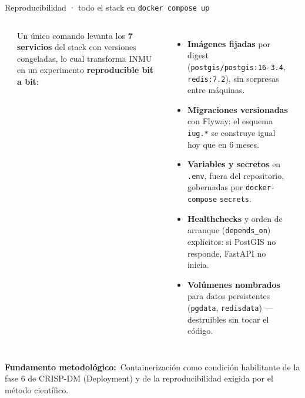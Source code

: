 \documentclass[aspectratio=169,11pt]{beamer}
\newcommand{\hi}[1]{\textcolor{inmuGreen}{\textbf{#1}}}
\newcommand{\framenote}[1]{%
  \vfill
  {\scriptsize\color{inmuMuted}\textbf{Fundamento metodológico:}\ #1}%
}
\begin{document}
\begin{frame}{Reproducibilidad · todo el stack en \texttt{docker compose up}}
\begin{columns}[T,onlytextwidth]
\begin{center}
{%
        }
      \end{center}
      \footnotesize
      Un único comando levanta los \hi{7 servicios} del stack con
      versiones congeladas, lo cual transforma INMU en un experimento
      \hi{reproducible bit a bit}:
      \begin{itemize}\itemsep1pt
        \item \hi{Imágenes fijadas} por digest (\texttt{postgis/postgis:16-3.4},
              \texttt{redis:7.2}), sin sorpresas entre máquinas.
        \item \hi{Migraciones versionadas} con Flyway: el esquema
              \texttt{iug.*} se construye igual hoy que en 6 meses.
        \item \hi{Variables y secretos} en \texttt{.env}, fuera del
              repositorio, gobernadas por \texttt{docker-compose} \texttt{secrets}.
        \item \hi{Healthchecks} y orden de arranque
              (\texttt{depends\_on}) explícitos: si PostGIS no responde,
              FastAPI no inicia.
        \item \hi{Volúmenes nombrados} para datos persistentes
              (\texttt{pgdata}, \texttt{redisdata}) — destruibles sin
              tocar el código.
      \end{itemize}
      \vspace{0.3em}
      \begin{center}
        \scriptsize
      \end{center}
  \end{columns}
  \framenote{Containerización como condición habilitante de la fase 6 de CRISP-DM (Deployment) y de la reproducibilidad exigida por el método científico.}
\end{frame}
\end{document}
